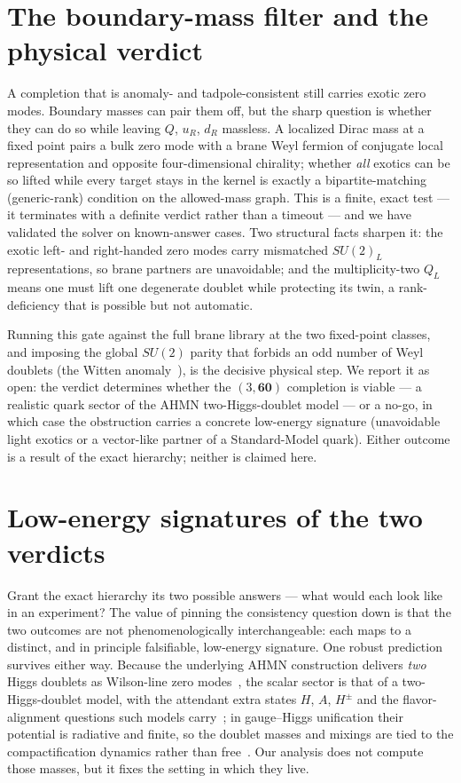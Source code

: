 \documentclass[11pt,a4paper]{article}
\begin{document}
\section{The boundary-mass filter and the physical verdict}\label{sec:n7}
A completion that is anomaly- and tadpole-consistent still carries exotic zero modes.
Boundary masses can pair them off, but the sharp question is whether they can do so
while leaving $Q$, $u_R$, $d_R$ massless. A localized Dirac mass at a fixed point pairs
a bulk zero mode with a brane Weyl fermion of conjugate local representation and opposite
four-dimensional chirality; whether \emph{all} exotics can be so lifted while every
target stays in the kernel is exactly a bipartite-matching (generic-rank) condition on
the allowed-mass graph. This is a finite, exact test --- it terminates with a definite
verdict rather than a timeout --- and we have validated the solver on known-answer
cases. Two structural facts sharpen it: the exotic left- and right-handed zero modes
carry mismatched $SU(2)_L$ representations, so brane partners are unavoidable; and the
multiplicity-two $Q_L$ means one must lift one degenerate doublet while protecting its
twin, a rank-deficiency that is possible but not automatic.

Running this gate against the full brane library at the two fixed-point classes, and
imposing the global $SU(2)$ parity that forbids an odd number of Weyl doublets (the
Witten anomaly~\cite{Witten82}), is the decisive physical step. We report
it as open: the verdict determines whether the $(3,\mathbf{60})$ completion is viable
--- a realistic quark sector of the AHMN two-Higgs-doublet model --- or a no-go, in
which case the obstruction carries a concrete low-energy signature (unavoidable light
exotics or a vector-like partner of a Standard-Model quark). Either outcome is a result
of the exact hierarchy; neither is claimed here.

\section{Low-energy signatures of the two verdicts}\label{sec:signatures}
Grant the exact hierarchy its two possible answers --- what would each look like in an
experiment? The value of pinning the consistency question down is that the two outcomes
are not phenomenologically interchangeable: each maps to a distinct, and in principle
falsifiable, low-energy signature. One robust prediction survives either way. Because
the underlying AHMN construction delivers \emph{two} Higgs doublets as Wilson-line zero
modes~\cite{AHMN}, the scalar sector is that of a two-Higgs-doublet model, with the
attendant extra states $H$, $A$, $H^\pm$ and the flavor-alignment questions such models
carry~\cite{2HDM}; in gauge--Higgs unification their potential is radiative and finite,
so the doublet masses and mixings are tied to the compactification dynamics rather than
free~\cite{Hosotani}. Our analysis does not compute those masses, but it fixes the
setting in which they live.
\end{document}
